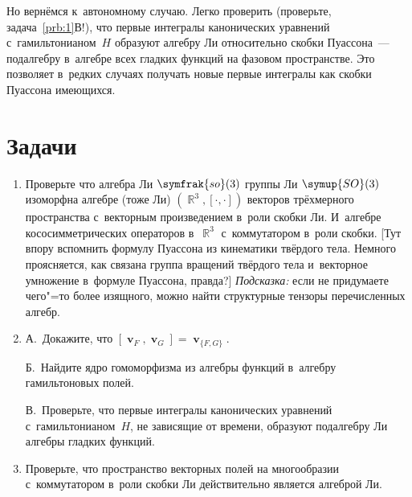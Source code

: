 \documentclass[a4paper,11pt]{article}
\theoremstyle{definition}
\begin{document}
Но вернёмся к~автономному случаю. Легко проверить (проверьте,
задача~\ref{prb:1}В!), что первые интегралы канонических уравнений
с~гамильтонианом~$H$ образуют алгебру Ли относительно скобки Пуассона~—
подалгебру в~алгебре всех гладких функций на фазовом пространстве. Это
позволяет в~редких случаях получать новые первые интегралы как скобки Пуассона
имеющихся.

\section{Задачи}

\begin{enumerate}

\item
Проверьте что алгебра Ли $\symfrak{so}(3)$ группы Ли $\symup{SO}(3)$ изоморфна
алгебре (тоже Ли) $(\BbbR^3,[\cdot,\cdot])$ векторов трёхмерного пространства
с~векторным произведением в~роли скобки Ли. И~алгебре кососимметрических
операторов в~$\BbbR^3$ с~коммутатором в~роли скобки. [Тут впору вспомнить формулу
Пуассона из кинематики твёрдого тела. Немного проясняется, как связана группа
вращений твёрдого тела и~векторное умножение в~формуле Пуассона, правда?]
\emph{Подсказка:\/} если не придумаете чего"=то более изящного, можно найти
структурные тензоры перечисленных алгебр.

\item\label{prb:1}
А.~Докажите, что $[\mbfv_F,\mbfv_G]=\mbfv_{\{F,G\}}$.

Б.~Найдите ядро гомоморфизма из алгебры функций в~алгебру гамильтоновых полей.

В.~Проверьте, что первые интегралы канонических уравнений с~гамильтонианом~$H$,
не зависящие от времени, образуют подалгебру Ли алгебры гладких функций.

\item
Проверьте, что пространство векторных полей на многообразии с~коммутатором в~роли
скобки Ли действительно является алгеброй Ли.


\end{enumerate}
\end{document}
